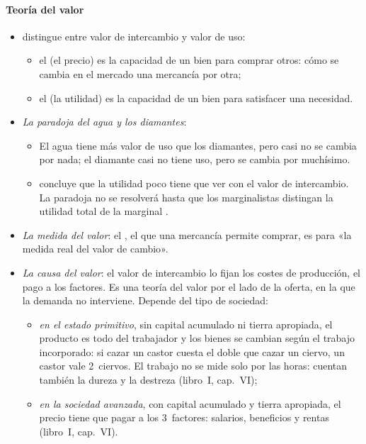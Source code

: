 \documentclass[11pt]{article}
\begin{document}
\paragraph{Teoría del valor}\label{sec:smith-valor}
\begin{itemize}
\item {} distingue entre valor de intercambio y valor de uso\nocite{Smith1776Wealth}:
  \begin{itemize}
  \item el  (el precio) es la capacidad de un bien para comprar otros: cómo se cambia en el mercado una mercancía por otra;
  \item el  (la utilidad) es la capacidad de un bien para satisfacer una necesidad.
  \end{itemize}
\item \emph{La paradoja del agua y los diamantes}:
  \begin{itemize}
  \item El agua tiene más valor de uso que los diamantes, pero casi no se cambia por nada; el diamante casi no tiene uso, pero se cambia por muchísimo.
  \item {} concluye que la utilidad poco tiene que ver con el valor de intercambio. La paradoja no se resolverá hasta que los marginalistas distingan la utilidad total de la marginal .
  \end{itemize}
\item \emph{La medida del valor}: el , el que una mercancía permite comprar, es para  «la medida real del valor de cambio»\nocite{Smith1776Wealth}.
\item \emph{La causa del valor}: el valor de intercambio lo fijan los costes de producción, el pago a los factores. Es una teoría del valor por el lado de la oferta, en la que la demanda no interviene. Depende del tipo de sociedad:
  \begin{itemize}
  \item \emph{en el estado primitivo}, sin capital acumulado ni tierra apropiada, el producto es todo del trabajador y los bienes se cambian según el trabajo incorporado: si cazar un castor cuesta el doble que cazar un ciervo, un castor vale 2~ciervos. El trabajo no se mide solo por las horas: cuentan también la dureza y la destreza (libro~I, cap.~VI);
  \item \emph{en la sociedad avanzada}, con capital acumulado y tierra apropiada, el precio tiene que pagar a los 3~factores: salarios, beneficios y rentas (libro~I, cap.~VI).

\end{itemize}
\end{itemize}
\end{document}
